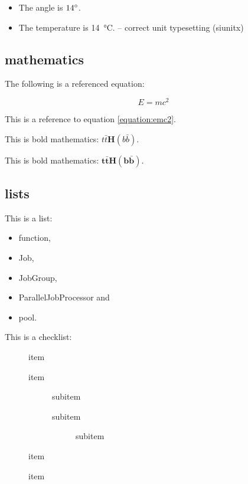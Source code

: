 \begin{itemize}
\item The angle is ${14\degree}$.
\item The temperature is \SI{14}{\celsius}. -- correct unit typesetting (siunitx)
\end{itemize}

\subsection{mathematics}

The following is a referenced equation:

\begin{equation}
\label{equation:emc2}
E=mc^{2}
\end{equation}

This is a reference to equation \ref{equation:emc2}.

This is bold mathematics: ${t\bar{t}\bm{H}\left(b\bar{b}\right)}$.

This is bold mathematics: ${\bm{t\bar{t}H\left(b\bar{b}\right)}}$.

\subsection{lists}

This is a list:

\begin{itemize}
\item function,
\item Job,
\item JobGroup,
\item ParallelJobProcessor and
\item pool.
\end{itemize}

\newpage

This is a checklist:

\begin{description}
\item[\Checkmark] item
\item[\Checkmark] item
    \begin{description}
    \item[\Checkmark] subitem
    \item[\Checkmark] subitem
        \begin{description}
        \item[\Checkmark] subitem
        \end{description}
    \end{description}
\item[\Checkmark] item
\item[\XSolidBrush] item
\end{description}

